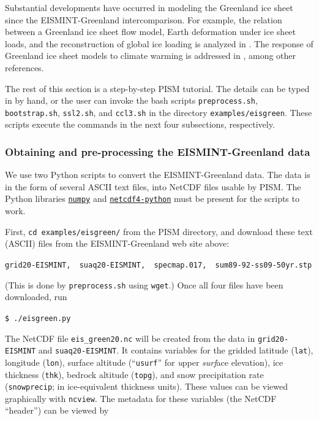 \documentclass[11pt,final]{amsart}
\begin{document}
Substantial developments have occurred in modeling the Greenland ice sheet since the EISMINT-Greenland intercomparison.  For example, the relation between a Greenland ice sheet flow model, Earth deformation under ice sheet loads, and the reconstruction of global ice loading is analyzed in \cite{TarasovPeltier}.  The response of Greenland ice sheet models to climate warming is addressed in \cite{HuybrechtsdeWolde,Huybrechts02, Greve00}, among other references.

The rest of this section is a step-by-step PISM tutorial.  The details can be typed in by hand, or the user can invoke the bash scripts \verb|preprocess.sh|, \verb|bootstrap.sh|, \verb|ssl2.sh|, and \verb|ccl3.sh| in the directory \verb|examples/eisgreen|.  These scripts execute the commands in the next four subsections, respectively.

\subsubsection*{Obtaining and pre-processing the EISMINT-Greenland data}  We use two Python scripts to convert the EISMINT-Greenland data.  The data is in the form of several ASCII text files, into NetCDF files usable by PISM.  The Python libraries \href{http://numpy.scipy.org/}{\texttt{numpy}} and \href{http://code.google.com/p/netcdf4-python/}{\texttt{netcdf4-python}} must be present for the scripts to work.

First, \verb|cd examples/eisgreen/| from the PISM directory, and download these text (ASCII) files from the EISMINT-Greenland web site above: 

\verb|grid20-EISMINT,  suaq20-EISMINT,  specmap.017,  sum89-92-ss09-50yr.stp|

\noindent (This is done by \verb|preprocess.sh| using \verb|wget|.) Once all four files have been downloaded, run

\verb|$ ./eisgreen.py|

\noindent The NetCDF file \verb|eis_green20.nc| will be created from the data in \verb|grid20-EISMINT| and \verb|suaq20-EISMINT|.  It contains variables for the gridded latitude (\verb|lat|), longitude (\verb|lon|), surface altitude (``\verb|usurf|'' for \emph{u}pper \emph{surf}ace elevation), ice thickness (\verb|thk|), bedrock altitude (\verb|topg|), and snow precipitation rate (\verb|snowprecip|; in ice-equivalent thickness units).  These values can be viewed graphically with \verb|ncview|.  The metadata for these variables (the NetCDF ``header'') can be viewed by
\end{document}
